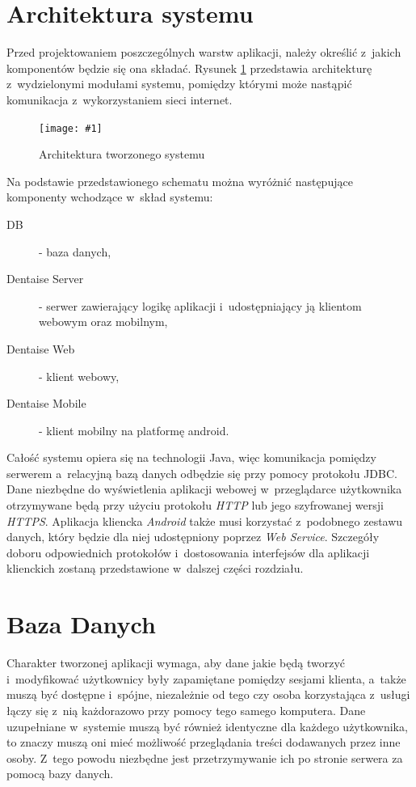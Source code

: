 \documentclass[11pt]{aghdpl}
\newcommand{\fullWidthPicture}[2]{
\begin{figure}[h!]
	\centering
		\texttt{[image: \#1]}
	\caption{#2}
	\label{fig:#1}
\end{figure}
}
\begin{document}
\section{Architektura systemu}

Przed projektowaniem poszczególnych warstw aplikacji, należy określić z~jakich komponentów będzie się ona składać. Rysunek \ref{fig:architektura} przedstawia architekturę z~wydzielonymi modułami systemu, pomiędzy którymi może nastąpić komunikacja z~wykorzystaniem sieci internet.

\fullWidthPicture{architektura}{Architektura tworzonego systemu}

Na podstawie przedstawionego schematu można wyróżnić następujące komponenty wchodzące w~skład systemu:
\begin{description}
\item[DB] - baza danych,
\item[Dentaise Server] - serwer zawierający logikę aplikacji i~udostępniający ją klientom webowym oraz mobilnym,
\item[Dentaise Web] - klient webowy,
\item[Dentaise Mobile] - klient mobilny na platformę android.
\end{description}

Całość systemu opiera się na technologii Java, więc komunikacja pomiędzy serwerem a~relacyjną bazą danych odbędzie się przy pomocy protokołu JDBC. Dane niezbędne do wyświetlenia aplikacji webowej w~przeglądarce użytkownika otrzymywane będą przy użyciu protokołu \emph{HTTP} lub jego szyfrowanej wersji \emph{HTTPS}. Aplikacja kliencka \emph{Android} także musi korzystać z~podobnego zestawu danych, który będzie dla niej udostępniony poprzez \emph{Web Service}. Szczegóły doboru odpowiednich protokołów i~dostosowania interfejsów dla aplikacji klienckich zostaną przedstawione w~dalszej części rozdziału. 

\section{Baza Danych}
\label{sec:bazaDanych}

Charakter tworzonej aplikacji wymaga, aby dane jakie będą tworzyć i~modyfikować użytkownicy były zapamiętane pomiędzy sesjami klienta, a~także muszą być dostępne i~spójne, niezależnie od tego czy osoba korzystająca z~usługi łączy się z~nią każdorazowo przy pomocy tego samego komputera. Dane uzupełniane w~systemie muszą być również identyczne dla każdego użytkownika, to znaczy muszą oni mieć możliwość przeglądania treści dodawanych przez inne osoby. Z~tego powodu niezbędne jest przetrzymywanie ich po stronie serwera za pomocą bazy danych.
\end{document}

